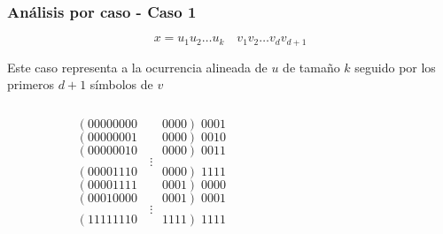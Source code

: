 \documentclass[10pt,mathserif]{beamer}%
\begin{document}


  


\begin{frame}
  \frametitle{Análisis por caso - Caso 1}
    $$x = u_1 u_2 \dots u_k \quad v_1 v_2 \dots v_{d} v_{d + 1}$$

  Este caso representa a la ocurrencia alineada de $u$ de tamaño $k$ seguido por los primeros $d+1$ símbolos de $v$

  \begin{columns}
    \begin{column}{0.5\textwidth}
      $$( 00000000 \qquad 0000 ) \; 0001$$
      $$( 00000001 \qquad 0000 ) \; 0010$$
      $$( 00000010 \qquad 0000 ) \; 0011$$
      $$\vdots$$
      $$( 00001110 \qquad 0000 ) \; 1111$$
      $$( 00001111 \qquad 0001 ) \; 0000$$
      $$( 00010000 \qquad 0001 ) \; 0001$$
      $$\vdots$$
      $$( 11111110 \qquad 1111 ) \; 1111$$
    \end{column}
    \begin{column}{0.5\textwidth}  %
        \begin{center}
         \end{center}
    \end{column}
    \end{columns}



\end{frame} 
\end{document}
